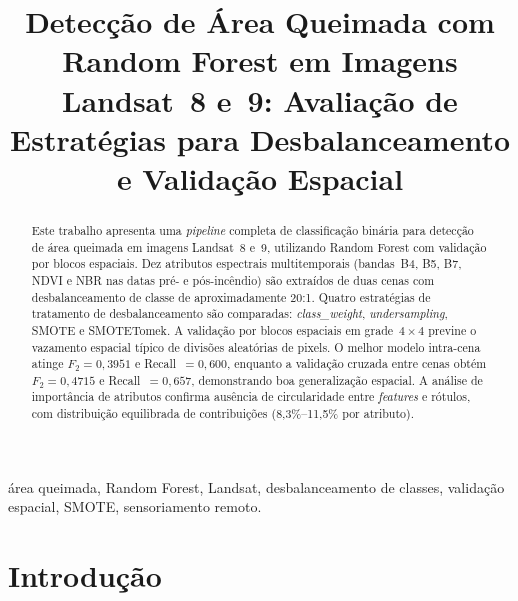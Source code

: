 \documentclass[conference]{IEEEtran}
\begin{document}
\title{Detecção de Área Queimada com Random Forest em Imagens Landsat~8 e~9:
Avaliação de Estratégias para Desbalanceamento e Validação Espacial}

\author{
}

\maketitle

\begin{abstract}
Este trabalho apresenta uma \textit{pipeline} completa de classificação binária
para detecção de área queimada em imagens Landsat~8 e~9, utilizando Random
Forest com validação por blocos espaciais. Dez atributos espectrais multitemporais
(bandas~B4, B5, B7, NDVI e NBR nas datas pré- e pós-incêndio) são extraídos de
duas cenas com desbalanceamento de classe de aproximadamente 20:1.
Quatro estratégias de tratamento de desbalanceamento são comparadas:
\textit{class\_weight}, \textit{undersampling}, SMOTE e SMOTETomek.
A validação por blocos espaciais em grade~$4\times4$ previne o vazamento
espacial típico de divisões aleatórias de pixels. O melhor modelo intra-cena
atinge $F_2 = 0{,}3951$ e Recall~$= 0{,}600$, enquanto a validação cruzada
entre cenas obtém $F_2 = 0{,}4715$ e Recall~$= 0{,}657$, demonstrando boa
generalização espacial. A análise de importância de atributos confirma ausência
de circularidade entre \textit{features} e rótulos, com distribuição equilibrada
de contribuições (8,3\%–11,5\% por atributo).
\end{abstract}

\begin{IEEEkeywords}
área queimada, Random Forest, Landsat, desbalanceamento de classes,
validação espacial, SMOTE, sensoriamento remoto.
\end{IEEEkeywords}

\section{Introdução}
\end{document}
